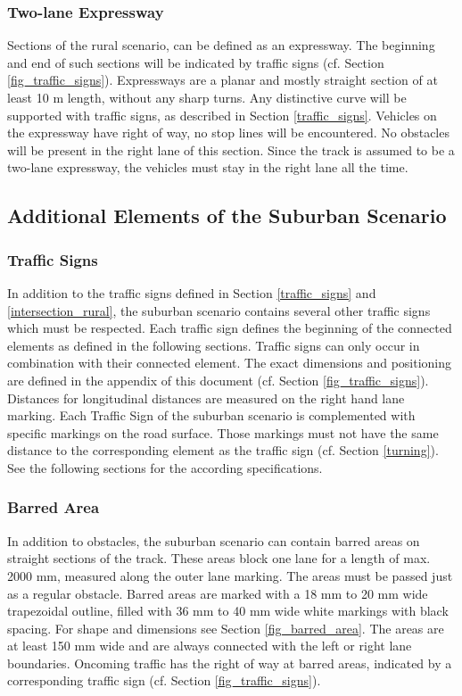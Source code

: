 \subsubsection{Two-lane Expressway}

Sections of the rural scenario, can be defined as an expressway. The beginning
and end of such sections will be indicated by traffic signs (cf. Section
\ref{fig_traffic_signs}). Expressways are a planar and mostly straight section
of at least 10 m length, without any sharp turns. Any distinctive curve will be
supported with traffic signs, as described in Section \ref{traffic_signs}.
Vehicles on the expressway have right of way, no stop lines will be
encountered. No obstacles will be present in the right lane of this section.
Since the track is assumed to be a two-lane expressway, the vehicles must stay
in the right lane all the time.

\subsection{Additional Elements of the Suburban Scenario}
\label{elements_suburban_scenario}
\subsubsection{Traffic Signs}

In addition to the traffic signs defined in Section \ref{traffic_signs} and
\ref{intersection_rural}, the suburban scenario contains several other traffic
signs which must be respected. Each traffic sign defines the beginning of the
connected elements as defined in the following sections. Traffic signs can only
occur in combination with their connected element. The exact dimensions and
positioning are defined in the appendix of this document (cf. Section
\ref{fig_traffic_signs}). Distances for longitudinal distances are measured on
the right hand lane marking. Each Traffic Sign of the suburban scenario is
complemented with specific markings on the road surface. Those markings must
not have the same distance to the corresponding element as the traffic sign
(cf. Section \ref{turning}). See the following sections for the according
specifications.

\subsubsection{Barred Area}

In addition to obstacles, the suburban scenario can contain barred areas on
straight sections of the track. These areas block one lane for a length of max.
2000 mm, measured along the outer lane marking. The areas must be passed just
as a regular obstacle. Barred areas are marked with a 18 mm to 20 mm wide
trapezoidal outline, filled with 36 mm to 40 mm wide white markings with black
spacing. For shape and dimensions see Section \ref{fig_barred_area}. The areas
are at least 150 mm wide and are always connected with the left or right lane
boundaries. Oncoming traffic has the right of way at barred areas, indicated by
a corresponding traffic sign (cf. Section \ref{fig_traffic_signs}).

